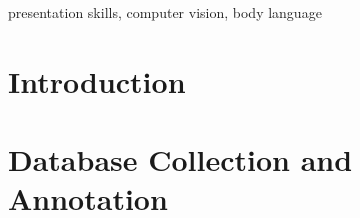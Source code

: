 \documentclass[review]{elsarticle}
\begin{document}
\begin{frontmatter}
\begin{keyword}
presentation skills, computer vision, body language
\end{keyword}
\end{frontmatter}

\section{Introduction}


\section{Database Collection and Annotation}

\end{document}
